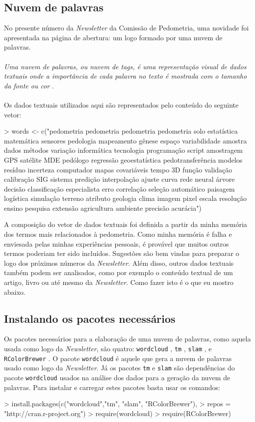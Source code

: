 \subsection{Nuvem de palavras}
No presente número da \textit{Newsletter} da Comissão de Pedometria, uma novidade foi apresentada na página de abertura: um logo formado por uma nuvem de palavras.\\
\\
\emph{Uma nuvem de palavras, ou nuvem de tags, é uma representação visual de dados textuais onde a importância de cada palavra no texto é mostrada com o tamanho da fonte ou cor} \citep{wiki:2013}.\\
\\
Os dados textuais utilizados aqui são representados pelo conteúdo do seguinte vetor:
\begin{smallverbatim}
 > words <- c("pedometria pedometria pedometria
 pedometria solo estatística matemática sensores
 pedologia mapeamento gênese espaço variabilidade
 amostra dados métodos variação informática
 tecnologia programação script amostragem GPS
 satélite MDE pedólogo regressão geoestatística
 pedotransferência modelos resíduo incerteza
 computador mapas covariáveis tempo 3D função
 validação calibração SIG sistema predição
 interpolação ajuste curva rede neural árvore
 decisão classificação especialista erro
 correlação seleção automático paisagem logística
 simulação terreno atributo geologia clima imagem
 pixel escala resolução ensino pesquisa extensão
 agricultura ambiente precisão acurácia")
\end{smallverbatim}
A composição do vetor de dados textuais foi definida a partir da minha memória dos termos mais relacionados à pedometria. Como minha memória é falha e enviesada pelas minhas experiências pessoais, é provável que muitos outros termos poderiam ter sido incluídos. Sugestões são bem vindas para preparar o logo dos próximos números da \textit{Newsletter}. Além disso, outros dados textuais também podem ser analisados, como por exemplo o conteúdo textual de um artigo, livro ou até mesmo da \textit{Newsletter}. Como fazer isto é o que eu mostro abaixo.
\subsection{Instalando os pacotes necessários}
\label{subsec:pacotes}
Os pacotes necessários para a elaboração de uma nuvem de palavras, como aquela usada como logo da \textit{Newsletter}, são quatro: \texttt{wordcloud} \citep{Fellows:2013}, \texttt{tm} \citep{FeinererEtAl:2013}, \texttt{slam} \citep{HornikEtAl:2013}, e \texttt{RColorBrewer} \citep{Neuwirth:2011}. O pacote \texttt{wordcloud} é aquele que gera a nuvem de palavras usado como logo da \textit{Newsletter}. Já os pacotes \texttt{tm} e \texttt{slam} são dependências do pacote \texttt{wordcloud} usados na análise dos dados para a geração da nuvem de palavras. Para instalar e carregar estes pacotes basta usar os comandos:
\begin{smallverbatim}
> install.packages(c("wordcloud","tm", "slam",
"RColorBrewer"),
> repos = "http://cran.r-project.org")
> require(wordcloud)
> require(RColorBrewer)
\end{smallverbatim}
